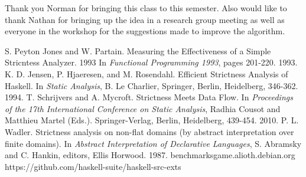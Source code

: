 \documentclass[preprint,nocopyrightspace]{sigplanconf}
\begin{document}
\acks

Thank you Norman for bringing this class to this semester. Also would like to thank Nathan for bringing up the idea in a research group meeting as well as everyone in the workshop for the suggestions made to improve the algorithm.





\begin{thebibliography}{}
\softraggedright

S. Peyton Jones and W. Partain. Measuring the Effectiveness of a Simple Stricntess Analyzer. 1993 In \emph{Functional Programming 1993}, pages 201-220. 1993.
K. D. Jensen, P. Hjaeresen, and M. Rosendahl. Efficient Strictness Analysis of Haskell. In \emph{Static Analysis}, B. Le Charlier, Springer, Berlin, Heidelberg, 346-362. 1994.
T. Schrijvers and A. Mycroft. Strictness Meets Data Flow. In \emph{Proceedings of the 17th International Conference on Static Analysis}, Radhia Cousot and Matthieu Martel (Eds.). Springer-Verlag, Berlin, Heidelberg, 439-454. 2010.
P. L. Wadler. Strictness analysis on non-flat domains (by abstract interpretation over finite domains). In \emph{Abstract Interpretation of Declarative Languages}, S. Abramsky and C. Hankin, editors, Ellis Horwood. 1987.
benchmarksgame.alioth.debian.org
https://github.com/haskell-suite/haskell-src-exts
\end{thebibliography}
\end{document}
